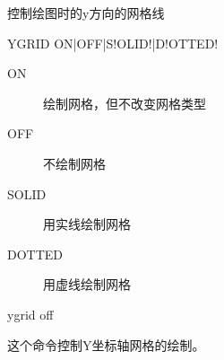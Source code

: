 \label{cmd:ygrid}

控制绘图时的y方向的网格线

\begin{SACSTX}
YGRID ON|OFF|S!OLID!|D!OTTED!
\end{SACSTX}

\begin{description}
\item [ON] 绘制网格，但不改变网格类型
\item [OFF] 不绘制网格
\item [SOLID] 用实线绘制网格
\item [DOTTED] 用虚线绘制网格
\end{description}

\begin{SACDFT}
ygrid off
\end{SACDFT}

这个命令控制Y坐标轴网格的绘制。

